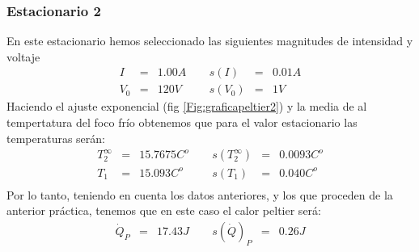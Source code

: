 \documentclass[12pt,a4paper]{article}
\begin{document}
\newpage
 
 
\subsubsection{Estacionario 2}
En este estacionario hemos seleccionado las siguientes magnitudes de intensidad y voltaje  
\begin{equation} 
\begin{array}{lllllll}
I & = & 1.00 A & \ \ & s(I) & = & 0.01  A \\ 
 V_0 & = & 120 V & \ \ & s(V_0) & = & 1 V
\end{array} 
\end{equation} 
 Haciendo el ajuste exponencial (fig \ref{Fig:graficapeltier2}) y la media de al tempertatura del foco frío obtenemos que para el valor estacionario las temperaturas serán: 
\begin{equation} 
\begin{array}{lllllll}
T_2^{\infty} & = & 15.7675 C^o &  \ \ &  s(T_2^{\infty}) & =  & 0.0093  C^o \\ 
 T_1 & = & 15.093  C^o & \ \ & s(T_1) & = & 0.040  C^o \\ 
 \end{array} 
\end{equation} 
 Por lo tanto, teniendo en cuenta los datos anteriores, y los que proceden de la anterior práctica, tenemos que en este caso el calor peltier será: 
\begin{equation} 
\begin{array}{lllllll}
\dot{Q}_P & = & 17.43 J & \ \ & s(\dot{Q})_P & = & 0.26 J \\ 
\end{array} 
\end{equation} 
 
 
 
 
\end{document}
